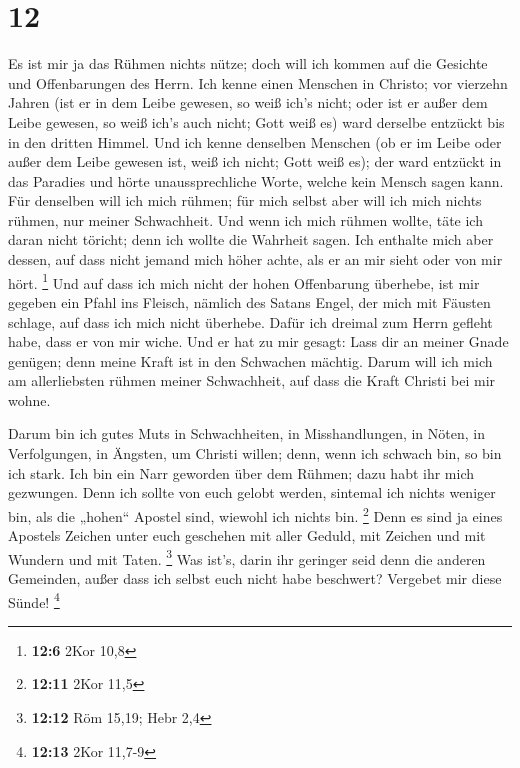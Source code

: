 \hypertarget{section-6}{%
\section{12}\label{section-6}}

 Es ist mir ja das Rühmen nichts nütze; doch will ich kommen
auf die Gesichte und Offenbarungen des Herrn.  Ich kenne
einen Menschen in Christo; vor vierzehn Jahren (ist er in dem Leibe
gewesen, so weiß ich's nicht; oder ist er außer dem Leibe gewesen, so
weiß ich's auch nicht; Gott weiß es) ward derselbe entzückt bis in den
dritten Himmel.  Und ich kenne denselben Menschen (ob er im
Leibe oder außer dem Leibe gewesen ist, weiß ich nicht; Gott weiß es);
 der ward entzückt in das Paradies und hörte
unaussprechliche Worte, welche kein Mensch sagen kann.  Für
denselben will ich mich rühmen; für mich selbst aber will ich mich
nichts rühmen, nur meiner Schwachheit.  Und wenn ich mich
rühmen wollte, täte ich daran nicht töricht; denn ich wollte die
Wahrheit sagen. Ich enthalte mich aber dessen, auf dass nicht jemand
mich höher achte, als er an mir sieht oder von mir hört. \footnote{\textbf{12:6}
  2Kor 10,8}  Und auf dass ich mich nicht der hohen
Offenbarung überhebe, ist mir gegeben ein Pfahl ins Fleisch, nämlich des
Satans Engel, der mich mit Fäusten schlage, auf dass ich mich nicht
überhebe.  Dafür ich dreimal zum Herrn gefleht habe, dass er
von mir wiche.  Und er hat zu mir gesagt: Lass dir an meiner
Gnade genügen; denn meine Kraft ist in den Schwachen mächtig. Darum will
ich mich am allerliebsten rühmen meiner Schwachheit, auf dass die Kraft
Christi bei mir wohne.

 Darum bin ich gutes Muts in Schwachheiten, in
Misshandlungen, in Nöten, in Verfolgungen, in Ängsten, um Christi
willen; denn, wenn ich schwach bin, so bin ich stark.  Ich
bin ein Narr geworden über dem Rühmen; dazu habt ihr mich gezwungen.
Denn ich sollte von euch gelobt werden, sintemal ich nichts weniger bin,
als die „hohen`` Apostel sind, wiewohl ich nichts bin. \footnote{\textbf{12:11}
  2Kor 11,5}  Denn es sind ja eines Apostels Zeichen unter
euch geschehen mit aller Geduld, mit Zeichen und mit Wundern und mit
Taten. \footnote{\textbf{12:12} Röm 15,19; Hebr 2,4}  Was
ist's, darin ihr geringer seid denn die anderen Gemeinden, außer dass
ich selbst euch nicht habe beschwert? Vergebet mir diese Sünde!
\footnote{\textbf{12:13} 2Kor 11,7-9}

